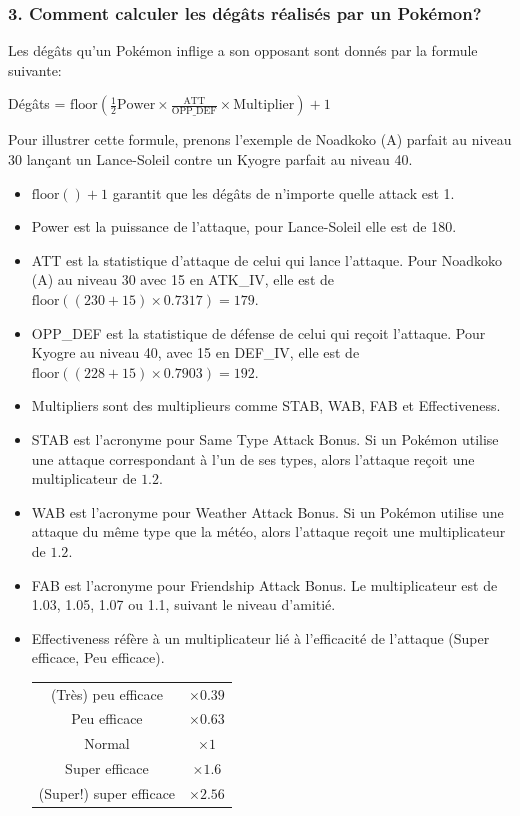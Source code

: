 \documentclass[12pt]{beamer}
\begin{document}
\begin{frame}
\frametitle{3. Comment calculer les dégâts réalisés par un Pokémon?}

\begin{block}{}
\begin{footnotesize}
Les dégâts qu'un Pokémon inflige a son opposant sont donnés par la formule suivante:
\begin{center}
Dégâts = $\text{floor}\left(\frac{1}{2}\text{Power} \times \frac{\text{ATT}}{\text{OPP\_DEF}}\times\text{Multiplier}\right) +1$
\end{center}

Pour illustrer cette formule, prenons l'exemple de Noadkoko (A) parfait au niveau 30 lançant un Lance-Soleil contre un Kyogre parfait au niveau 40.
\begin{itemize}
  \item $\text{floor}\left(\right)+1$ garantit que les dégâts de n'importe quelle attack est 1.
  \item Power est la puissance de l'attaque, pour Lance-Soleil elle est de 180.
  \item ATT est la statistique d'attaque de celui qui lance l'attaque. Pour Noadkoko (A) au niveau 30 avec 15 en ATK\_IV, elle est de $\text{floor}((230+15)\times0.7317) = 179$.
  \item OPP\_DEF est la statistique de défense de celui qui reçoit l'attaque. Pour Kyogre au niveau 40, avec 15 en DEF\_IV, elle est de $\text{floor}((228+15)\times0.7903) = 192$.
  \item Multipliers sont des multiplieurs comme  STAB, WAB, FAB et Effectiveness.
  \item STAB est l'acronyme pour Same Type Attack Bonus. Si un Pok\'emon utilise une attaque correspondant à l'un de ses types, alors l'attaque reçoit une multiplicateur de $1.2$.
  \item WAB est l'acronyme pour Weather Attack Bonus. Si un Pok\'emon utilise une attaque du même type que la météo, alors l'attaque reçoit une multiplicateur de $1.2$.
  \item FAB est l'acronyme pour Friendship Attack Bonus. Le multiplicateur est de 1.03, 1.05, 1.07 ou 1.1, suivant le niveau d'amitié.
  \item Effectiveness réfère à un multiplicateur lié à l'efficacité de l'attaque (Super efficace, Peu efficace).

\begin{center}
\begin{tabular}{cc}
(Très) peu efficace & $\times 0.39$ \\
Peu efficace & $\times 0.63$ \\
Normal & $\times 1$ \\
Super efficace & $\times 1.6$  \\ 
(Super!) super efficace & $\times 2.56$ \\
\end{tabular} 
\end{center}
\end{itemize}


\end{footnotesize}
\end{block}
\end{frame}
\end{document}
